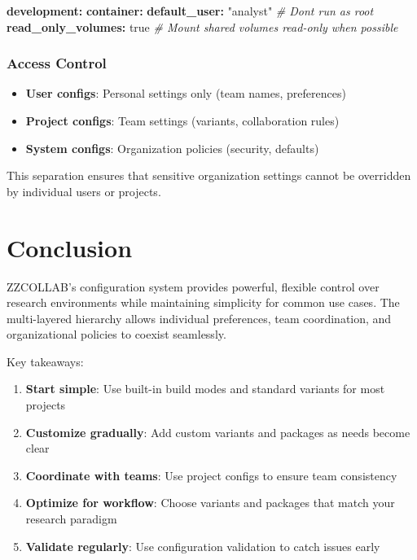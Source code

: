 \documentclass[
]{article}
\newenvironment{Shaded}{\begin{snugshade}}{\end{snugshade}}
\newcommand{\AttributeTok}[1]{\textcolor[rgb]{0.13,0.29,0.53}{#1}}
\newcommand{\CharTok}[1]{\textcolor[rgb]{0.31,0.60,0.02}{#1}}
\newcommand{\CommentTok}[1]{\textcolor[rgb]{0.56,0.35,0.01}{\textit{#1}}}
\newcommand{\FunctionTok}[1]{\textcolor[rgb]{0.13,0.29,0.53}{\textbf{#1}}}
\newcommand{\KeywordTok}[1]{\textcolor[rgb]{0.13,0.29,0.53}{\textbf{#1}}}
\newcommand{\StringTok}[1]{\textcolor[rgb]{0.31,0.60,0.02}{#1}}
\providecommand{\tightlist}{%
  \setlength{\itemsep}{0pt}\setlength{\parskip}{0pt}}
\begin{document}
\begin{Shaded}
\begin{Highlighting}[]
\FunctionTok{development}\KeywordTok{:}
\AttributeTok{  }\FunctionTok{container}\KeywordTok{:}
\AttributeTok{    }\FunctionTok{default\_user}\KeywordTok{:}\AttributeTok{ }\StringTok{"analyst"}\CommentTok{          \# Don\textquotesingle{}t run as root}
\AttributeTok{    }\FunctionTok{read\_only\_volumes}\KeywordTok{:}\AttributeTok{ }\CharTok{true}\CommentTok{          \# Mount shared volumes read{-}only when possible}
\end{Highlighting}
\end{Shaded}

\subsubsection{Access Control}\label{access-control}

\begin{itemize}
\tightlist
\item
  \textbf{User configs}: Personal settings only (team names,
  preferences)
\item
  \textbf{Project configs}: Team settings (variants, collaboration
  rules)
\item
  \textbf{System configs}: Organization policies (security, defaults)
\end{itemize}

This separation ensures that sensitive organization settings cannot be
overridden by individual users or projects.

\section{Conclusion}\label{conclusion}

ZZCOLLAB's configuration system provides powerful, flexible control over
research environments while maintaining simplicity for common use cases.
The multi-layered hierarchy allows individual preferences, team
coordination, and organizational policies to coexist seamlessly.

Key takeaways:

\begin{enumerate}
\def\labelenumi{\arabic{enumi}.}
\tightlist
\item
  \textbf{Start simple}: Use built-in build modes and standard variants
  for most projects
\item
  \textbf{Customize gradually}: Add custom variants and packages as
  needs become clear
\item
  \textbf{Coordinate with teams}: Use project configs to ensure team
  consistency
\item
  \textbf{Optimize for workflow}: Choose variants and packages that
  match your research paradigm
\item
  \textbf{Validate regularly}: Use configuration validation to catch
  issues early
\end{enumerate}
\end{document}
